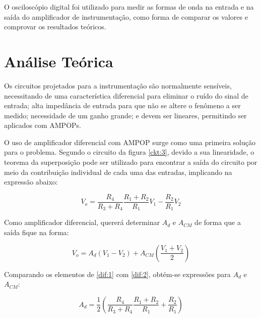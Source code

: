 O osciloscópio digital foi utilizado para medir as formas de onda na entrada e na saída do amplificador de instrumentação, como forma de comparar os valores e comprovar os resultados teóricos.


\section{Análise Teórica}

Os circuitos projetados para a instrumentação são normalmente sensíveis, necessitando de uma característica diferencial para eliminar o ruído do sinal de entrada; alta impedância de entrada para que não se altere o fenômeno a ser medido; necessidade de um ganho grande; e devem ser lineares, permitindo ser aplicados com AMPOPs.



O uso de amplificador diferencial com AMPOP surge como uma primeira solução para o problema. Segundo o circuito da figura \ref{ckt:3}, devido a sua linearidade, o teorema da superposição pode ser utilizado para encontrar a saída do circuito por meio da contribuição individual de cada uma das entradas, implicando na expressão abaixo:

\begin{center}
\begin{equation} \label{dif:1}
        V_o = \frac{R_4}{R_3+R_4}\frac{R_1+R_2}{R_1}V_1 - \frac{R_2}{R_1}V_2
\end{equation}
\end{center}

Como amplificador diferencial, quererá determinar $A_d$ e $A_{CM}$ de forma que a saída fique na forma:

\begin{center}
\begin{equation} \label{dif:2}
        V_o = A_d(V_1-V_2)+A_{CM}\left(\frac{V_1+V_2}{2}\right)
\end{equation}
\end{center}

Comparando os elementos de \ref{dif:1} com \ref{dif:2}, obtém-se expressões para $A_d$ e $A_{CM}$:

\begin{center}
\begin{equation} \label{ad:1}
        A_d = \frac{1}{2}\left(\frac{R_4}{R_3+R_4}\frac{R_1+R_2}{R_1} + \frac{R_2}{R_1}\right)
\end{equation}
\end{center}

